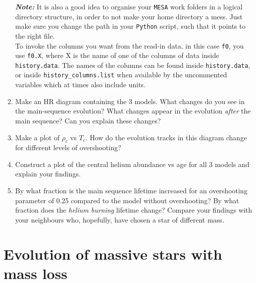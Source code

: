 \documentclass[11pt,a4paper]{article}
\begin{document}
\begin{enumerate}
\emph{\textbf{Note:}} It is also a good idea to organise your \texttt{MESA} work folders in a logical directory structure, in order to not make your home directory a mess. Just make sure you change the path in your \texttt{Python} script, such that it points to the right file. \\[1ex]
To invoke the columns you want from the read-in data, in this case \texttt{f0}, you use \texttt{f0.X}, where X is the name of one of the columns of data inside \texttt{history.data}. The names of the columns can be found inside \texttt{history.data}, or inside \texttt{history\_columns.list} when available by the uncommented variables which at times also include units. 


\item Make an HR diagram containing the 3 models. What changes do you see in the main-sequence evolution? What changes appear in the evolution \emph{after} the main sequence? Can you explain these changes?

\item Make a plot of $\rho_c$ vs $T_c$. How do the evolution tracks in this diagram change for different levels of overshooting?

\item Construct a plot of the central helium abundance vs age for all 3 models and explain your findings. 

\item By what fraction is the main sequence lifetime increased for an overshooting parameter of 0.25 compared to the model without overshooting? By what fraction does the \emph{helium burning} lifetime change? Compare your findings with your neighbours who, hopefully, have chosen a star of different mass.

\end{enumerate}

\section{Evolution of massive stars with mass loss}
\end{document}
